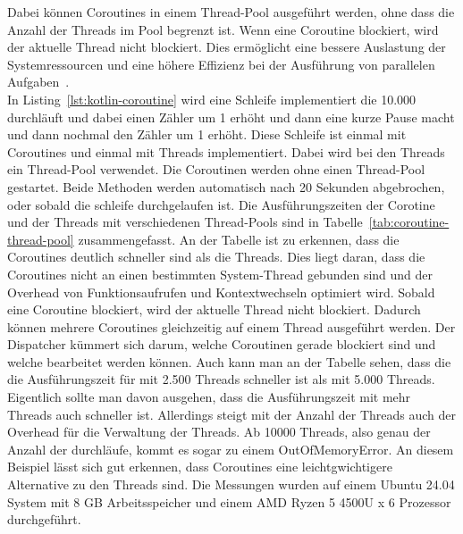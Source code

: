 \documentclass[11pt]{article}
\begin{document}
    Dabei können Coroutines in einem Thread-Pool ausgeführt werden, ohne dass die Anzahl der Threads im Pool begrenzt ist.
    Wenn eine Coroutine blockiert, wird der aktuelle Thread nicht blockiert.
    Dies ermöglicht eine bessere Auslastung der Systemressourcen und eine höhere Effizienz bei der Ausführung von parallelen Aufgaben~\cite[194]{kotlin-patterns}.
    \\
    In Listing~\ref{lst:kotlin-coroutine} wird eine Schleife implementiert die 10.000 durchläuft und dabei einen Zähler um 1 erhöht und dann eine kurze Pause macht und dann nochmal den Zähler um 1 erhöht.
    Diese Schleife ist einmal mit Coroutines und einmal mit Threads implementiert.
    Dabei wird bei den Threads ein Thread-Pool verwendet.
    Die Coroutinen werden ohne einen Thread-Pool gestartet.
    Beide Methoden werden automatisch nach 20 Sekunden abgebrochen, oder sobald die schleife durchgelaufen ist.
    Die Ausführungszeiten der Corotine und der Threads mit verschiedenen Thread-Pools sind in Tabelle~\ref{tab:coroutine-thread-pool} zusammengefasst.
    An der Tabelle ist zu erkennen, dass die Coroutines deutlich schneller sind als die Threads.
    Dies liegt daran, dass die Coroutines nicht an einen bestimmten System-Thread gebunden sind und der Overhead von Funktionsaufrufen und Kontextwechseln optimiert wird.
    Sobald eine Coroutine blockiert, wird der aktuelle Thread nicht blockiert.
    Dadurch können mehrere Coroutines gleichzeitig auf einem Thread ausgeführt werden.
    Der Dispatcher kümmert sich darum, welche Coroutinen gerade blockiert sind und welche bearbeitet werden können.
    Auch kann man an der Tabelle sehen, dass die die Ausführungszeit für mit 2.500 Threads schneller ist als mit 5.000 Threads.
    Eigentlich sollte man davon ausgehen, dass die Ausführungszeit mit mehr Threads auch schneller ist.
    Allerdings steigt mit der Anzahl der Threads auch der Overhead für die Verwaltung der Threads.
    Ab 10000 Threads, also genau der Anzahl der durchläufe, kommt es sogar zu einem OutOfMemoryError.
    An diesem Beispiel lässt sich gut erkennen, dass Coroutines eine leichtgwichtigere Alternative zu den Threads sind.
    Die Messungen wurden auf einem Ubuntu 24.04 System mit 8 GB Arbeitsspeicher und einem AMD Ryzen 5 4500U x 6 Prozessor durchgeführt.
\end{document}
